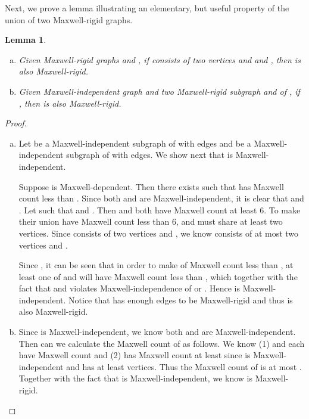 \documentclass[10pt]{article}
\newtheorem{lem}{Lemma}
\begin{document}
Next, we prove a lemma illustrating an elementary, but useful property of the union of two Maxwell-rigid graphs.
\begin{lem}\label{lem:join}
\begin{enumerate}[(a)]
\item \label{lem:join1} Given Maxwell-rigid graphs  and , if    consists of two vertices  and  and     , then    is also Maxwell-rigid. 
\item \label{lem:join2} Given Maxwell-independent graph  and two Maxwell-rigid subgraph  and  of , if   , then    is also Maxwell-rigid.
\end{enumerate}

\end{lem}
\begin{proof}
\begin{enumerate}[(a)]
\item Let  be a Maxwell-independent subgraph of  with    edges and  be a Maxwell-independent subgraph of  with    edges. We show next that    is Maxwell-independent.

 Suppose    is Maxwell-dependent. Then there exists     such that  has Maxwell count less than . Since both  and  are Maxwell-independent, it is clear that  and . Let  such that  and . Then  and  both have Maxwell count at least 6. To make their union have Maxwell count less than 6,  and  must share at least two vertices. Since  consists of two vertices  and , we know    consists of at most two vertices  and .

Since , it can be seen that in order to make  of Maxwell count less than , at least one of  and  will have Maxwell count less than , which together with the fact that  and  violates Maxwell-independence of  or . Hence    is Maxwell-independent. Notice that    has enough edges to be Maxwell-rigid and thus    is also Maxwell-rigid.

\item Since  is Maxwell-independent, we know both   and  are Maxwell-independent. Then can we calculate the Maxwell count of  as follows. We know (1)  and  each have Maxwell count  and (2)    has Maxwell count at least  since    is Maxwell-independent and has at least  vertices. Thus the Maxwell count of    is at most . Together with the fact that    is Maxwell-independent, we know    is Maxwell-rigid.
\end{enumerate}
\end{proof}
\end{document}

